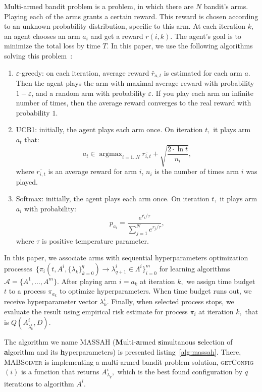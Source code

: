 \documentclass{svproc}
\DeclareMathOperator*{\argmax}{argmax}
\begin{document}
Multi-armed bandit problem is a problem, in which there are $N$ bandit's arms. Playing each of the arms grants a certain reward. This reward is chosen according to an unknown probability distribution, specific to this arm. At each iteration $k,$ an agent chooses an arm $a_i$ and get a reward $r(i, k)$. The agent's goal is to minimize the total loss by time $T$. In this paper, we use the following algorithms solving this problem~\cite{reinfl}:
\begin{enumerate}
\item $\varepsilon$-greedy: on each iteration, average reward $\bar r_{a, t}$ is estimated for each arm $a.$ Then the agent plays the arm with maximal average reward with probability $1 - \varepsilon$, and a random arm with probability $\varepsilon.$ If you play each arm an infinite number of times, then the average reward converges to the real reward with probability $1.$

\item  UCB1: initially, the agent plays each arm once. On iteration $t,$ it plays arm $a_t$ that:
\[
a_t \in \argmax_{i=1..N}  \overline {r_{i,t}} + \sqrt{\frac {2 \cdot \ln t} {n_i}}, 
\]  
where $\overline {r_{i,t}}$ is an average reward for arm $i$, $n_i$ is the number of times arm $i$ was played. 

\item Softmax: initially, the agent plays each arm once. On iteration $t,$ it plays arm $a_i$ with probability:
\[
p_{a_i} = \frac{e^{{\bar{r_i} / \tau}}}{\sum_{j=1}^N e^{r_j / \tau}},
\]
where $\tau$ is positive temperature parameter. %
\end{enumerate}

In this paper, we associate arms with sequential hyperparameters optimization processes~$\{\pi_i(t, A^i, \{\lambda_k\}^q_{k=0}) \rightarrow \lambda^i_{q+1} \in \Lambda^i\}_{i=0}^m$ for learning algorithms $\mathscr{A} = \{A^1, \dots, A^m\}$. After playing arm $i = a_k$ at iteration $k,$ we assign time budget $t$ to a process $\pi_{a_k}$ to optimize hyperparameters. When time budget runs out, we receive hyperparameter vector $\lambda^i_k$. Finally, when selected process stops, we evaluate the result using empirical risk estimate for process $\pi_i$ at iteration $k,$ that is $Q(A^i_{\lambda^i_k}, D)$.

The algorithm we name MASSAH (\textbf{M}ulti-\textbf{a}rmed \textbf{s}imultanous \textbf{s}election of \textbf{a}lgorithm and its \textbf{h}yperparameters) is presented listing~\ref{alg:massah}. There, \textsc{MABSolver} is implementing a multi-armed bandit problem solution, \textsc{getConfig}$(i)$ is a function that returns $A^i_{\lambda_q},$ which is the best found configuration by $q$ iterations to algorithm $A^i$.
\end{document}
